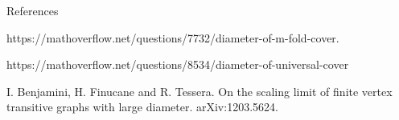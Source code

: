\documentclass{beamer}
\begin{document}
\begin{frame}\frametitle{}


References\\

\bigskip

https://mathoverflow.net/questions/7732/diameter-of-m-fold-cover.\\

\bigskip

https://mathoverflow.net/questions/8534/diameter-of-universal-cover\\

\bigskip

I. Benjamini, H. Finucane and R. Tessera. On the scaling limit of finite vertex transitive graphs with large diameter. arXiv:1203.5624.

\end{frame}

\end{document}
